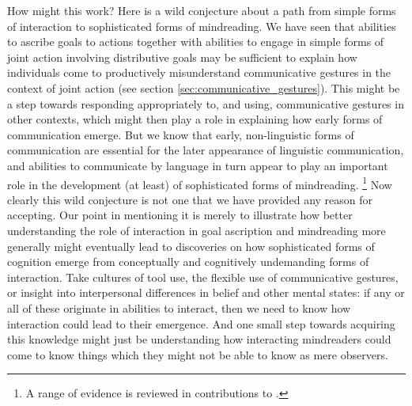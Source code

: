 \documentclass[12pt,a4paper]{extarticle}
\begin{document}
How might this work?
Here is a wild conjecture about
a path from simple forms of interaction to sophisticated forms of mindreading.
We have seen that 
	abilities to ascribe goals to actions 
 together with
	abilities to engage in simple forms of joint action involving distributive goals
 may be sufficient to explain how individuals come to productively misunderstand communicative gestures in the context of joint action (see section \vref{sec:communicative_gestures}).
This might  be a step towards responding appropriately to, and using, communicative gestures in other contexts,
which might then play a role in explaining how early forms of communication emerge.
But we know that early, non-linguistic forms of communication are essential for the later appearance of linguistic communication,
and abilities to communicate by language in turn appear to play an important role in the development (at least) of sophisticated forms of mindreading.%
\footnote{
A range of evidence is reviewed in contributions to \citet{Astington2005ot}.
}
Now clearly this wild conjecture is not one that we have provided any reason for accepting.
Our point in mentioning it is merely to illustrate how
 better understanding the role of interaction in goal ascription and  mindreading more generally
might eventually lead to discoveries
on how
 sophisticated forms of cognition
 emerge from
 conceptually and cognitively undemanding forms of interaction.
Take cultures of tool use,
	the flexible use of communicative gestures,
	or insight into interpersonal differences in belief and other mental states:
if any or all of these 
originate in abilities to interact,
then we need to know how interaction could lead to their emergence.
And one small step towards acquiring this knowledge might just be 
understanding how interacting mindreaders 
could 
	come to know things 
which they might not be able to know 
 as mere observers.



\end{document}
